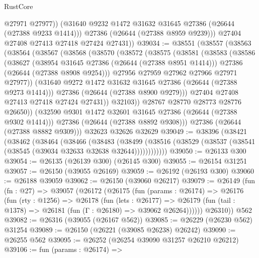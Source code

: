 \begin{lexlean}{RustCore}
\begin{coremodule}
              @27971
              @27977))
          (@31640 @9232 @1472 @31632 @31645 @27386 (@26644 (@27388 @9233 @1414)))
          @27386
          (@26644 (@27388 @8959 @9239)))
        @27404
        @27408
        @27413
        @27418
        @27424
        @27431))
@39034 := @38551
    (@38557
      (@38563
        (@38564
          (@38567
            (@38568
              (@38570
                (@38572
                  (@38575
                    (@38581
                      (@38583
                        (@38586
                          (@38627
                            (@38954 @31645 @27386 (@26644 (@27388 @8951 @1414)))
                            @27386
                            (@26644 (@27388 @8908 @9254)))
                          @27956
                          @27959
                          @27962
                          @27966
                          @27971
                          @27977))
                      (@31640 @9272 @1472 @31632 @31645 @27386 (@26644 (@27388 @9273 @1414)))
                      @27386
                      (@26644 (@27388 @8900 @9279)))
                    @27404
                    @27408
                    @27413
                    @27418
                    @27424
                    @27431))
                @32103))
            @28767
            @28770
            @28773
            @28776
            @26650))
        (@32590 @9301 @1472 @32601 @31645 @27386 (@26644 (@27388 @9302 @1414)))
        @27386
        (@26644 (@27388 @8892 @9308)))
      @27386
      (@26644 (@27388 @8882 @9309)))
    @32623
    @32626
    @32629
@39049 := @38396
    (@38421
      (@38462
        (@38464
          (@38466
            (@38483
              (@38499
                (@38516 (@38529 (@38537 (@38541 (@38545 (@39034 @32633 @32638 @32644))))))))))))
@39050 := @26133 @300
@39054 := @26135 (@26139 @300) (@26145 @300)
@39055 := @26154 @31251
@39057 := @26150 (@39055 @26169)
@39059 := @26192 (@26193 @300)
@39060 := @26188 @39059
@39062 := @26150 (@39060 @26217)
@39079 := @26149
    (fun (fn : @27) =>
    @39057
      (@26172
        (@26175
          (fun (params : @26174) =>
          @26176
            (fun (rty : @1256) =>
            @26178
              (fun (lets : @26177) =>
              @26179 (fun (tail : @1378) => @26181 (fun (Γ : @26180) => @39062 @26264))))))
        @26310))
    @562
@39082 := @26316 (@39055 (@26167 @562))
@39085 := @26229 (@26230 @562) @31254
@39089 := @26150 (@26221 (@39085 @26238) @26242)
@39090 := @26255 @562
@39095 := @26252 (@26254 @39090 @31257 @26210 @26212)
@39106 := fun (params : @26174) =>

\end{coremodule}
\end{lexlean}
